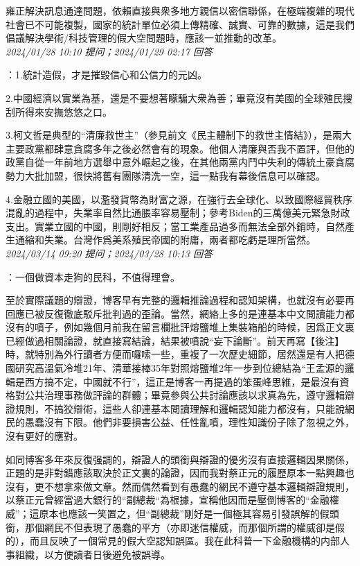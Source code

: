 \documentclass[twocolumn]{ctexart}
\begin{document}
雍正解決訊息通達問題，依賴直接與衆多地方親信以密信聯係，在極端複雜的現代社會已不可能複製，國家的統計單位必須上傳精確、誠實、可靠的數據，這是我們倡議解決學術/科技管理的假大空問題時，應該一並推動的改革。
\\

\textit{\hfill\noindent\small 2024/01/28 10:10 提问；2024/01/29 02:17 回答}

：1.統計造假，才是摧毀信心和公信力的元凶。

2.中國經濟以實業為基，還是不要想著矇騙大衆為善；畢竟沒有美國的全球殖民搜刮所得來安撫悠悠之口。

3.柯文哲是典型的“清廉救世主”（參見前文《民主體制下的救世主情結》），是兩大主要政黨都肆意貪腐多年之後必然會有的現象。他個人清廉與否我不置評，但他的政黨自從一年前地方選舉中意外崛起之後，在其他兩黨内鬥中失利的傳統土豪貪腐勢力大批加盟，很快將舊有團隊清洗一空，這一點我有幕後信息可以確認。

4.金融立國的美國，以濫發貨幣為財富之源，在強行去全球化、以致國際經貿秩序混亂的過程中，失業率自然比通脹率容易壓制；參考Biden的三萬億美元緊急財政支出。實業立國的中國，則剛好相反；當工業產品過多而無法全部外銷時，自然產生通縮和失業。台灣作爲美系殖民帝國的附庸，兩者都吃虧是理所當然。
\\

\textit{\hfill\noindent\small 2024/03/14 09:20 提问；2024/03/28 10:13 回答}

：一個做資本走狗的民科，不值得理會。

至於實際議題的辯證，博客早有完整的邏輯推論過程和認知架構，也就沒有必要再回應已被反復徹底駁斥批判過的歪論。當然，網絡上多的是連基本中文閲讀能力都沒有的噴子，例如幾個月前我在留言欄批評熔鹽堆上集裝箱船的時候，因爲正文裏已經做過相關論證，就直接寫結論，結果被噴說“妄下論斷”。前天再寫【後注】時，就特別為外行讀者方便而囉嗦一些，重複了一次歷史細節，居然還是有人把德國研究高溫氣冷堆21年、清華接棒35年對照熔鹽堆2年一步到位總結為“王孟源的邏輯是西方搞不定，中國就不行”，這正是博客一再提過的笨蛋峰思維，是最沒有資格對公共治理事務做評論的群體；畢竟參與公共討論應該以求真為先，遵守邏輯辯證規則，不搞狡辯術，這些人卻連基本閲讀理解和邏輯認知能力都沒有，只能說網民的愚蠢沒有下限。他們非要損害公益、任性亂噴，理性知識份子除了忽視之外，沒有更好的應對。


如同博客多年來反復强調的，辯證人的頭銜與辯證的優劣沒有直接邏輯因果關係，正題的是非對錯應該取決於正文裏的論證，因而我對蔡正元的履歷原本一點興趣也沒有，更不想拿來做文章。然而偶然看到有愚蠢的網民不遵守基本邏輯辯證規則，以蔡正元曾經當過大銀行的“副總裁“為根據，宣稱他因而是壓倒博客的“金融權威”；這原本也應該一笑置之，但“副總裁”剛好是一個極其容易引發誤解的假頭銜，那個網民不但表現了愚蠢的平方（亦即迷信權威，而那個所謂的權威卻是假的），而且反映了一個常見的假大空認知誤區。我在此科普一下金融機構的内部人事組織，以方便讀者日後避免被誤導。
\end{document}

